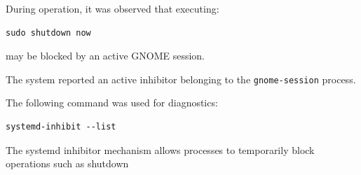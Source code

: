 During operation, it was observed that executing:

\begin{lstlisting}[style=terminal]
sudo shutdown now
\end{lstlisting}

may be blocked by an active GNOME session.

The system reported an active inhibitor belonging to the
\texttt{gnome-session} process.

The following command was used for diagnostics:

\begin{lstlisting}[style=terminal]
systemd-inhibit --list
\end{lstlisting}

The systemd inhibitor mechanism allows processes to temporarily block
operations such as shutdown